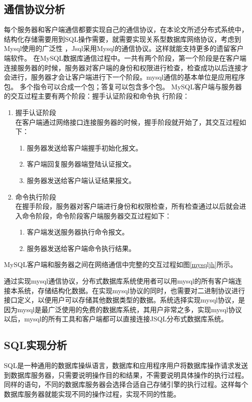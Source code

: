 \subsection{通信协议分析}
每个服务器和客户端通信都要实现自己的通信协议，在本论文所述分布式系统中，结构化存储需要用到SQL操作需要，就需要实现关系型数据库网络协议，考虑到Mysql使用的广泛性
，Jsql采用Mysql的通信协议。这样就能支持更多的遗留客户端软件。
在MySQL数据库通信过程中。一共有两个阶段，第一个阶段是在客户端连接服务器的时候，服务器对客户端的身份和权限进行检查，检查成功以后连接才会进行，服务器才会让客户端进行下一个阶段。mysql通信的基本单位是应用程序包。
多个指令可以合成一个包；答复可以包含多个包。
MySQL客户端与服务器的交互过程主要有两个阶段：握手认证阶段和命令执
行阶段：
\begin{enumerate}
	\item 握手认证阶段\\
	在客户端通过网络接口连接服务器的时候，握手阶段就开始了，其交互过程如下：
	\begin{enumerate}
		\item 服务器发送给客户端握手初始化报文。
		\item 客户端回复服务器端登陆认证报文。
		\item 服务器发送给客户端认证结果报文。
	\end{enumerate}
	\item 命令执行阶段\\
	在握手阶段，服务器对客户端进行身份和权限检查，所有检查通过以后就会进入命令阶段，命令阶段客户端服务器交互过程如下：
	\begin{enumerate}
		\item 	客户端发送服务器执行命令报文。
		\item 服务器发送给客户端命令执行结果。
	\end{enumerate}
\end{enumerate}
MySQL客户端和服务器之间在网络通信中完整的交互过程如图\ref{mysqljh}所示。

通过实现mysql通信协议，分布式数据库系统使用者可以用mysql的所有客户端连接本系统，存储结构化数据。在实现mysql协议的同时，也需要对二进制协议进行接口定义，以便用户可以存储其他数据类型的数据。系统选择实现mysql协议，是因为mysql是最广泛使用的免费的数据库系统，其用户非常之多，实现mysql协议以后，mysql的所有工具和客户端都可以直接连接JSQL分布式数据库系统。
\subsection{SQL实现分析}
SQL是一种通用的数据库操纵语言，数据库和应用程序用户将数据库操作请求发送到数据库服务器，只需要说明操作目的和结果，不需要说明具体操作的执行过程。同样的语句，不同的数据库服务器会选择合适自己存储引擎的执行过程。这样每个数据库服务器就能实现不同的操作过程，实现不同的性能。

